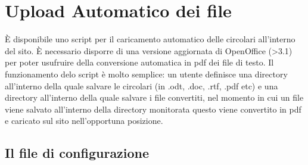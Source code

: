 \chapter[Auto Upload]{Upload Automatico dei file}

È disponibile uno script per il caricamento automatico delle circolari all'interno del sito. È necessario disporre di una versione aggiornata di OpenOffice (>3.1) per poter usufruire della conversione automatica in pdf dei file di testo.
Il funzionamento delo script è molto semplice: un utente definisce una directory all'interno della quale salvare le circolari (in .odt, .doc, .rtf, .pdf etc) e una directory all'interno della quale salvare i file convertiti, nel momento in cui un file viene salvato all'interno della directory monitorata questo viene convertito in pdf e caricato sul sito nell'opportuna posizione.
\section{Il file di configurazione}

